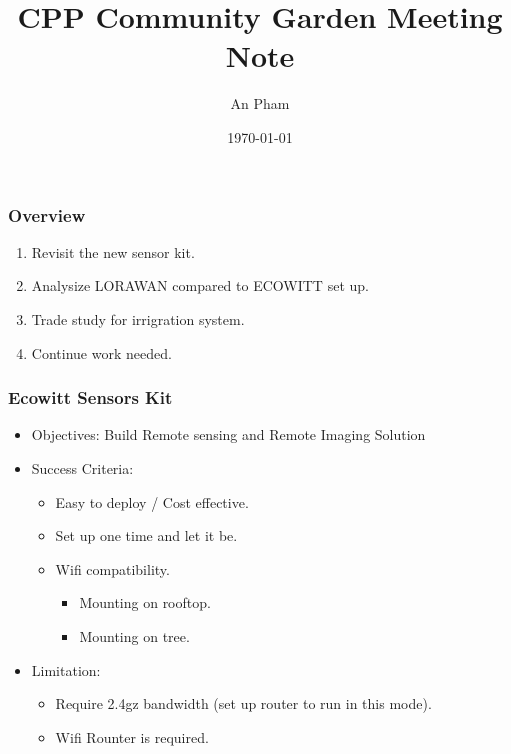 \documentclass{beamer}
\title{CPP Community Garden Meeting Note}
\author{An Pham}
\institute{Calpoly Pomona}
\date{\today}
\begin{document}
\frame{\titlepage}

\begin{frame}
\frametitle{Overview}
\begin{enumerate}
  \item Revisit the new sensor kit.
   \item Analysize LORAWAN compared to ECOWITT set up.
   \item Trade study for irrigration system.
   \item Continue work needed.
\end{enumerate}
\end{frame}

\begin{frame}
  \frametitle{Ecowitt Sensors Kit}
  \begin{itemize}
        \item Objectives: Build Remote sensing and Remote Imaging Solution
    \item Success Criteria:
      \begin{itemize}
        \item Easy to deploy / Cost effective.
        \item Set up one time and let it be.
	\item Wifi compatibility.
          \begin{itemize}
            \item Mounting on rooftop.
            \item Mounting on tree.
          \end{itemize}
      \end{itemize}
    \item Limitation: 
      \begin{itemize}
        \item Require 2.4gz bandwidth (set up router to run in this mode).
	\item Wifi Rounter is required.
      \end{itemize}
  \end{itemize}
 \end{frame}
\end{document}
